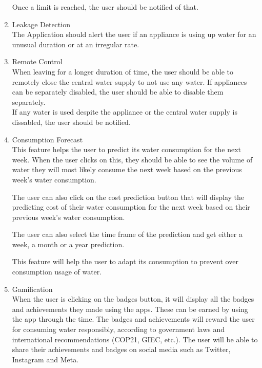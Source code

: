 \documentclass[10pt]{article}
\begin{document}
\begin{multicols*}{2}
\begin{enumerate}
  Once a limit is reached, the user should be notified of that.


  \item {Leakage Detection} \\
  The Application should alert the user if an appliance is using up water for an unusual duration or at an irregular rate.
  
  \item {Remote Control} \\
  When leaving for a longer duration of time, the user should be able to remotely close the central water supply to not use any water. If appliances can be separately disabled, the user should be able to disable them separately. \\
  If any water is used despite the appliance or the central water supply is dissabled, the user should be notified.

  \item {Consumption Forecast} \\
  This feature helps the user to predict its water consumption for the next week. When the user clicks on this, they should be able to see the volume of water they will most likely consume the next week based on the previous week's water consumption.

  The user can also click on the cost prediction button that will display the predicting cost of their water consumption for the next week based on their previous week's water consumption.

  The user can also select the time frame of the prediction and get either a week, a month or a year prediction.

  This feature will help the user to adapt its consumption to prevent over consumption usage of water.

  \item {Gamification} \\
  When the user is clicking on the badges button, it will display all the badges and achievements they made using the apps. These can be earned by using the app through the time. The badges and achievements will reward the user for consuming water responsibly, according to government laws and international recommendations (COP21, GIEC, etc.). The user will be able to share their achievements and badges on social media such as Twitter, Instagram and Meta.

\end{enumerate}

\clearpage


\end{multicols*}
\end{document}
